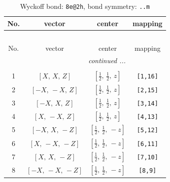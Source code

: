 \documentclass[fleqn,8pt]{jsarticle}
\begin{document}
\begin{longtable}{cccc}
\caption{Wyckoff bond: {\tt 8e@2h}, bond symmetry: {\tt ..m}}
 \\
 \hline \hline
No. & vector & center & mapping \\ \hline \endfirsthead

\multicolumn{3}{l}{\tablename\ \thetable{}} \\
 \hline \hline
No. & vector & center & mapping \\ \hline \endhead

 \hline \hline
\multicolumn{3}{r}{\footnotesize\it continued ...} \\ \endfoot

 \hline \hline
\multicolumn{3}{r}{} \\ \endlastfoot

1 & $\left[ X,\, X,\, Z \right]$ & $\left[ \frac{1}{2},\, \frac{1}{2},\, z \right]$ & {\tt [1,16]} \\ \hline
2 & $\left[ - X,\, - X,\, Z \right]$ & $\left[ \frac{1}{2},\, \frac{1}{2},\, z \right]$ & {\tt [2,15]} \\ \hline
3 & $\left[ - X,\, X,\, Z \right]$ & $\left[ \frac{1}{2},\, \frac{1}{2},\, z \right]$ & {\tt [3,14]} \\ \hline
4 & $\left[ X,\, - X,\, Z \right]$ & $\left[ \frac{1}{2},\, \frac{1}{2},\, z \right]$ & {\tt [4,13]} \\ \hline
5 & $\left[ - X,\, X,\, - Z \right]$ & $\left[ \frac{1}{2},\, \frac{1}{2},\, - z \right]$ & {\tt [5,12]} \\ \hline
6 & $\left[ X,\, - X,\, - Z \right]$ & $\left[ \frac{1}{2},\, \frac{1}{2},\, - z \right]$ & {\tt [6,11]} \\ \hline
7 & $\left[ X,\, X,\, - Z \right]$ & $\left[ \frac{1}{2},\, \frac{1}{2},\, - z \right]$ & {\tt [7,10]} \\ \hline
8 & $\left[ - X,\, - X,\, - Z \right]$ & $\left[ \frac{1}{2},\, \frac{1}{2},\, - z \right]$ & {\tt [8,9]} \\
\end{longtable}
\renewcommand{\arraystretch}{1.2}
\end{document}
